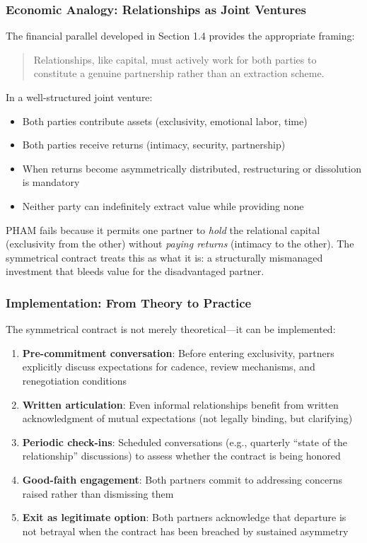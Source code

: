 \documentclass[12pt, letterpaper]{article}
\begin{document}
\subsubsection{Economic Analogy: Relationships as Joint Ventures}

The financial parallel developed in Section 1.4 provides the appropriate framing:

\begin{quote}
Relationships, like capital, must actively work for both parties to constitute a genuine partnership rather than an extraction scheme.
\end{quote}

In a well-structured joint venture:
\begin{itemize}
    \item Both parties contribute assets (exclusivity, emotional labor, time)
    \item Both parties receive returns (intimacy, security, partnership)
    \item When returns become asymmetrically distributed, restructuring or dissolution is mandatory
    \item Neither party can indefinitely extract value while providing none
\end{itemize}

PHAM fails because it permits one partner to \textit{hold} the relational capital (exclusivity from the other) without \textit{paying returns} (intimacy to the other). The symmetrical contract treats this as what it is: a structurally mismanaged investment that bleeds value for the disadvantaged partner.

\subsubsection{Implementation: From Theory to Practice}

The symmetrical contract is not merely theoretical---it can be implemented:

\begin{enumerate}
    \item \textbf{Pre-commitment conversation}: Before entering exclusivity, partners explicitly discuss expectations for cadence, review mechanisms, and renegotiation conditions
    \item \textbf{Written articulation}: Even informal relationships benefit from written acknowledgment of mutual expectations (not legally binding, but clarifying)
    \item \textbf{Periodic check-ins}: Scheduled conversations (e.g., quarterly ``state of the relationship'' discussions) to assess whether the contract is being honored
    \item \textbf{Good-faith engagement}: Both partners commit to addressing concerns raised rather than dismissing them
    \item \textbf{Exit as legitimate option}: Both partners acknowledge that departure is not betrayal when the contract has been breached by sustained asymmetry
\end{enumerate}
\end{document}
